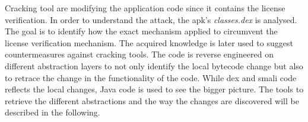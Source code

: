 Cracking tool are modifying the application code since it contains the license verification.
In order to understand the attack, the \gls{apk}'s \textit{classes.dex} is analysed.
The goal is to identify how the exact mechanism applied to circumvent the license verification mechanism.
The acquired knowledge is later used to suggest countermeasures against cracking tools.
\newline
The code is reverse engineered on different abstraction layers to not only identify the local bytecode change but also to retrace the change in the functionality of the code.
While dex and smali code reflects the local changes, Java code is used to see the bigger picture.
The tools to retrieve the different abstractions and the way the changes are discovered will be described in the following.
